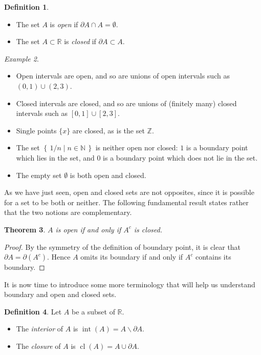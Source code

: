 \documentclass[11pt,oneside]{amsbook}
\newcommand{\set}[1]{\left\{\,#1\,\right\}}
\newcommand{\N}{\mathbb N}
\newcommand{\Z}{\mathbb Z}
\newcommand{\R}{\mathbb R}
\DeclareMathOperator{\cl}{cl}
\DeclareMathOperator{\inte}{int}
\renewcommand{\setminus}{\smallsetminus}
\theoremstyle{definition}
\theoremstyle{plain}
\newtheorem{thm}{Theorem}[section]
\theoremstyle{definition}
\newtheorem{defn}[thm]{Definition}
\theoremstyle{remark}
\newtheorem{example}[thm]{Example}
\numberwithin{equation}{section}
\numberwithin{figure}{section}
\begin{document}
\begin{defn}
  \begin{itemize}
    \item The set $A$ is \emph{open} if $\partial A\cap A=\emptyset$.
    \item The set $A\subset\R$ is \emph{closed} if $\partial A\subset A$.
  \end{itemize}
\end{defn}

\begin{example}
  \begin{itemize}
  \item Open intervals are open, and so are unions of open intervals such as $(0,1)\cup(2,3)$.
  \item Closed intervals are closed, and so are unions of (finitely many) closed intervals such as $[0,1]\cup[2,3]$.
  \item Single points $\{x\}$ are closed, as is the set $\Z$.
  \item The set $\set{1/n\mid n\in\N}$ is neither open nor closed: $1$ is a boundary point which lies in the set, and $0$ is a boundary point which does not lie in the set.
  \item The empty set $\emptyset$ is both open and closed.
  \end{itemize}
\end{example}

As we have just seen, open and closed sets are not opposites, since it is possible for a set to be both or neither. The following fundamental result states rather that the two notions are complementary.

\begin{thm}
  $A$ is open if and only if $A^c$ is closed.
\end{thm}

\begin{proof}
  By the symmetry of the definition of boundary point, it is clear that $\partial A=\partial(A^c)$. Hence $A$ omits its boundary if and only if $A^c$ contains its boundary.
\end{proof}

It is now time to introduce some more terminology that will help us understand boundary and open and closed sets.

\begin{defn}
  Let $A$ be a subset of $\R$.
  \begin{itemize}
    \item The \emph{interior} of $A$ is $\inte(A)=A\setminus\partial A$.
    \item The \emph{closure} of $A$ is $\cl(A)=A\cup\partial A$.
  \end{itemize}
\end{defn}
\end{document}
